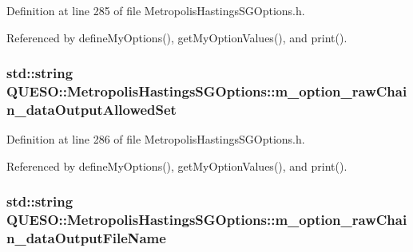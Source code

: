 Definition at line 285 of file Metropolis\-Hastings\-S\-G\-Options.\-h.



Referenced by define\-My\-Options(), get\-My\-Option\-Values(), and print().

\hypertarget{class_q_u_e_s_o_1_1_metropolis_hastings_s_g_options_a53a51bf8aa24d9dbe4a9115453bd9e2b}{
\subsubsection[{m\-\_\-option\-\_\-raw\-Chain\-\_\-data\-Output\-Allowed\-Set}]{\setlength{\rightskip}{0pt plus 5cm}std\-::string Q\-U\-E\-S\-O\-::\-Metropolis\-Hastings\-S\-G\-Options\-::m\-\_\-option\-\_\-raw\-Chain\-\_\-data\-Output\-Allowed\-Set\hspace{0.3cm}{\ttfamily [private]}}}\label{class_q_u_e_s_o_1_1_metropolis_hastings_s_g_options_a53a51bf8aa24d9dbe4a9115453bd9e2b}


Definition at line 286 of file Metropolis\-Hastings\-S\-G\-Options.\-h.



Referenced by define\-My\-Options(), get\-My\-Option\-Values(), and print().

\hypertarget{class_q_u_e_s_o_1_1_metropolis_hastings_s_g_options_a28d13976ef26bc450575528a37e1eeb6}{
\subsubsection[{m\-\_\-option\-\_\-raw\-Chain\-\_\-data\-Output\-File\-Name}]{\setlength{\rightskip}{0pt plus 5cm}std\-::string Q\-U\-E\-S\-O\-::\-Metropolis\-Hastings\-S\-G\-Options\-::m\-\_\-option\-\_\-raw\-Chain\-\_\-data\-Output\-File\-Name\hspace{0.3cm}{\ttfamily [private]}}}\label{class_q_u_e_s_o_1_1_metropolis_hastings_s_g_options_a28d13976ef26bc450575528a37e1eeb6}


